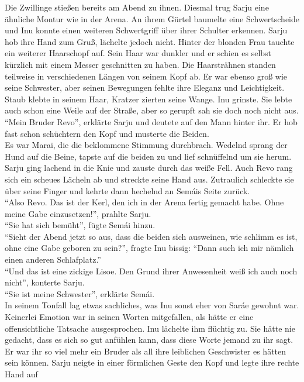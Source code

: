 Die Zwillinge stießen bereits am Abend zu ihnen. Diesmal trug Sarju eine ähnliche Montur wie in der 
Arena. An ihrem Gürtel baumelte eine Schwertscheide und Inu konnte einen weiteren Schwertgriff über 
ihrer Schulter erkennen. Sarju hob ihre Hand zum Gruß, lächelte jedoch nicht. Hinter der blonden 
Frau tauchte ein weiterer Haarschopf auf. Sein Haar war dunkler und er schien es selbst kürzlich 
mit einem Messer geschnitten zu haben. Die Haarsträhnen standen teilweise in verschiedenen Längen 
von seinem Kopf ab. Er war ebenso groß wie seine Schwester, aber seinen Bewegungen fehlte ihre 
Eleganz und Leichtigkeit. Staub klebte in seinem Haar, Kratzer zierten seine Wange. Inu grinste. 
Sie lebte auch schon eine Weile auf der Straße, aber so gerupft sah sie doch noch nicht aus. \\
``Mein Bruder Revo'', erklärte Sarju und deutete auf den Mann hinter ihr. Er hob fast schon 
schüchtern den Kopf und musterte die Beiden.\\
Es war Marai, die die beklommene Stimmung durchbrach. Wedelnd sprang der Hund auf die Beine, tapste 
auf die beiden zu und lief schnüffelnd um sie herum. Sarju ging lachend in die Knie und zauste 
durch das weiße Fell. Auch Revo rang sich ein scheues Lächeln ab und streckte seine Hand aus. 
Zutraulich schleckte sie über seine Finger und kehrte dann hechelnd an Semáis Seite zurück. \\
``Also Revo. Das ist der Kerl, den ich in der Arena fertig gemacht habe. Ohne meine Gabe 
einzusetzen!'', prahlte Sarju.\\
``Sie hat sich bemüht'', fügte Semái hinzu.\\
``Sieht der Abend jetzt so aus, dass die beiden sich ausweinen, wie schlimm es ist, ohne eine Gabe 
geboren zu sein?'', fragte Inu bissig: ``Dann such ich mir nämlich einen anderen Schlafplatz.''\\
``Und das ist eine zickige Lisoe. Den Grund ihrer Anwesenheit weiß ich auch noch nicht'', konterte 
Sarju.\\
``Sie ist meine Schwester'', erklärte Semái.\\
In seinem Tonfall lag etwas sachliches, was Inu sonst eher von Saráe gewohnt war. Keinerlei Emotion 
war in seinen Worten mitgefallen, als hätte er eine offensichtliche Tatsache ausgesprochen. Inu 
lächelte ihm flüchtig zu. Sie hätte nie gedacht, dass es sich so gut anfühlen kann, dass diese 
Worte jemand zu ihr sagt. Er war ihr so viel mehr ein Bruder als all ihre leiblichen Geschwister es 
hätten sein können. Sarju neigte in einer förmlichen Geste den Kopf und legte ihre rechte Hand auf 
